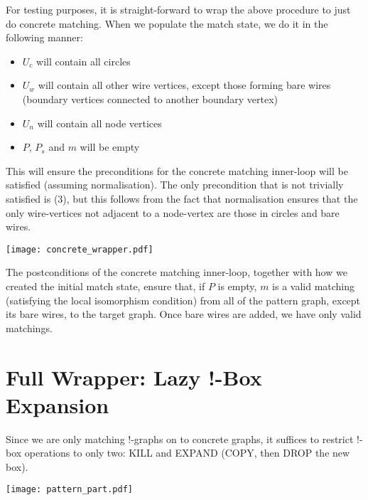\documentclass{article}
\begin{document}
For testing purposes, it is straight-forward to wrap the above procedure to just do concrete matching.  When we populate the match state, we do it in the following manner:
\begin{itemize}
\item $U_c$ will contain all circles
\item $U_w$ will contain all other wire vertices, except those forming bare wires (boundary vertices connected to another boundary vertex)
\item $U_n$ will contain all node vertices
\item $P$, $P_s$ and $m$ will be empty
\end{itemize}

This will ensure the preconditions for the concrete matching inner-loop will be satisfied (assuming normalisation).  The only precondition that is not trivially satisfied is (3), but this follows from the fact that normalisation ensures that the only wire-vertices not adjacent to a node-vertex are those in circles and bare wires.

\begin{center}
  \texttt{[image: concrete\_wrapper.pdf]}
\end{center}

The postconditions of the concrete matching inner-loop, together with how we created the initial match state, ensure that, if $P$ is empty, $m$ is a valid matching (satisfying the local isomorphism condition) from all of the pattern graph, except its bare wires, to the target graph.  Once bare wires are added, we have only valid matchings.

\section{Full Wrapper: Lazy !-Box Expansion}

Since we are only matching !-graphs on to concrete graphs, it suffices to restrict !-box operations to only two: KILL and EXPAND (COPY, then DROP the new box).

\begin{center}
  \texttt{[image: pattern\_part.pdf]}
\end{center}
\end{document}
